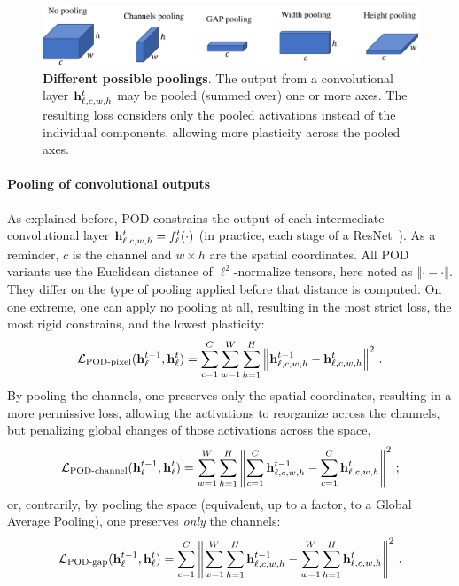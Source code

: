 \begin{figure}[tb]
    \begin{center}
        \includegraphics[width=0.90\linewidth]{images/podnet/pooling}
    \end{center}
    \caption{\textbf{Different possible poolings}. The output from a convolutional layer
        $\mathbf{h}^{t}_{\ell,c,w,h}$ may be pooled (summed over) one or more axes. The resulting loss
        considers only the pooled activations instead of the individual components, allowing more
        plasticity across the pooled axes.}
    \label{fig:pooling}
\end{figure}

\paragraph{Pooling of convolutional outputs} As explained before, POD constrains the output of each
intermediate convolutional layer $\mathbf{h}^{t}_{\ell,c,w,h} = f^{t}_\ell(\cdot)$ (in practice, each stage
of a ResNet~\citep{he2016resnet}). As a reminder, $c$ is the channel and $w\times h$ are the spatial
coordinates. All POD variants use the Euclidean distance of $\ell^2$-normalize tensors, here noted
as $\left\Vert\cdot-\cdot\right\Vert$. They differ on the type of pooling applied before that
distance is computed.
%
On one extreme, one can apply no pooling at all, resulting in the most strict loss, the most rigid
constrains, and the lowest plasticity:
%
\begin{equation}
    \mathcal{L}_{\text{POD-pixel}}(\mathbf{h}^{t-1}_\ell, \mathbf{h}^t_\ell) = \sum_{c=1}^C \sum_{w=1}^{W} \sum_{h=1}^{H} \left\Vert \mathbf{h}^{t-1}_{\ell,c,w,h} - \mathbf{h}^t_{\ell,c,w,h} \right\Vert^2\label{eq:pod_pixel}\,.
\end{equation}
%
By pooling the channels, one preserves only the spatial coordinates, resulting in a more permissive
loss, allowing the activations to reorganize across the channels, but penalizing global changes of
those activations across the space,
%
\begin{equation}
    \mathcal{L}_{\text{POD-channel}}(\mathbf{h}^{t-1}_\ell, \mathbf{h}^t_\ell)  = \sum_{w=1}^{W} \sum_{h=1}^{H} \left\Vert \sum_{c=1}^C \mathbf{h}^{t-1}_{\ell,c,w,h} - \sum_{c=1}^C \mathbf{h}^{t}_{\ell,c,w,h} \right\Vert^2\label{eq:pod_channel}\,;
\end{equation}
%
or, contrarily, by pooling the space (equivalent, up to a factor, to a Global Average Pooling), one
preserves \textit{only} the channels:
%
\begin{equation}
    \mathcal{L}_{\text{POD-gap}}(\mathbf{h}^{t-1}_\ell, \mathbf{h}^t_\ell) = \sum_{c=1}^{C} \left\Vert \sum_{w=1}^{W} \sum_{h=1}^H \mathbf{h}^{t-1}_{\ell,c,w,h} - \sum_{w=1}^{W} \sum_{h=1}^H \mathbf{h}^{t}_{\ell,c,w,h} \right\Vert^2\label{eq:pod_gap}\,.
\end{equation}
%

